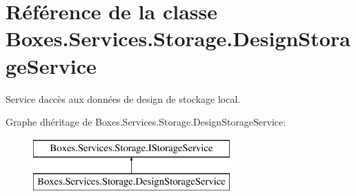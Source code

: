 \hypertarget{class_boxes_1_1_services_1_1_storage_1_1_design_storage_service}{}\section{Référence de la classe Boxes.\+Services.\+Storage.\+Design\+Storage\+Service}
\label{class_boxes_1_1_services_1_1_storage_1_1_design_storage_service}


Service d\textquotesingle{}accès aux données de design de stockage local.  


Graphe d\textquotesingle{}héritage de Boxes.\+Services.\+Storage.\+Design\+Storage\+Service\+:\begin{figure}[H]
\begin{center}
\leavevmode
\includegraphics[height=2.000000cm]{class_boxes_1_1_services_1_1_storage_1_1_design_storage_service}
\end{center}
\end{figure}
